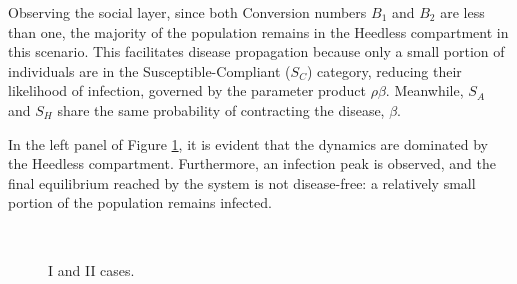 Observing the social layer, since both Conversion numbers $B_1$ and $B_2$ are less than one, the majority of the population remains in the Heedless compartment in this scenario. This facilitates disease propagation because only a small portion of individuals are in the Susceptible-Compliant ($S_C$) category, reducing their likelihood of infection, governed by the parameter product $\rho \beta$. Meanwhile, $S_A$ and $S_H$ share the same probability of contracting the disease, $\beta$.

In the left panel of Figure \ref{fig:sim_B1_B2_less_equal}, it is evident that the dynamics are dominated by the Heedless compartment. Furthermore, an infection peak is observed, and the final equilibrium reached by the system is not disease-free: a relatively small portion of the population remains infected.

\begin{figure}[h]
	\centering
	 \quad
	 \\
	\caption[Full model simulation figure first]{I and II cases.}
	\label{fig:sim_B1_B2_less_equal}
\end{figure}

